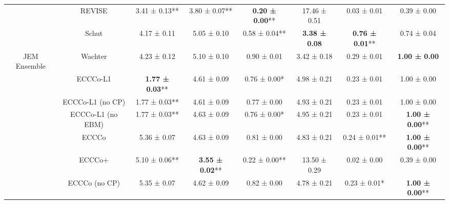 \begin{table}
{\begin{tabular}[t]{cccccccc}
 & REVISE & 3.41 ± 0.13** & 3.80 ± 0.07** & \textbf{0.20 ± 0.00}** & 17.46 ± 0.51\hphantom{*}\hphantom{*} & 0.03 ± 0.01\hphantom{*}\hphantom{*} & 0.39 ± 0.00\hphantom{*}\hphantom{*}\\

 & Schut & 4.17 ± 0.11\hphantom{*}\hphantom{*} & 5.05 ± 0.10\hphantom{*}\hphantom{*} & 0.58 ± 0.04** & \textbf{3.38 ± 0.08}\hphantom{*}\hphantom{*} & \textbf{0.76 ± 0.01}** & 0.74 ± 0.04\hphantom{*}\hphantom{*}\\

\multirow[t]{-10}{*}{\centering\arraybackslash JEM Ensemble} & Wachter & 4.23 ± 0.12\hphantom{*}\hphantom{*} & 5.10 ± 0.10\hphantom{*}\hphantom{*} & 0.90 ± 0.01\hphantom{*}\hphantom{*} & 3.42 ± 0.18\hphantom{*}\hphantom{*} & 0.29 ± 0.01\hphantom{*}\hphantom{*} & \textbf{1.00 ± 0.00}\hphantom{*}\hphantom{*}\\
\cmidrule{1-8}
 & ECCCo-L1 & \textbf{1.77 ± 0.03}** & 4.61 ± 0.09\hphantom{*}\hphantom{*} & 0.76 ± 0.00*\hphantom{*} & 4.98 ± 0.21\hphantom{*}\hphantom{*} & 0.23 ± 0.01\hphantom{*}\hphantom{*} & 1.00 ± 0.00\hphantom{*}\hphantom{*}\\

 & ECCCo-L1 (no CP) & 1.77 ± 0.03** & 4.61 ± 0.09\hphantom{*}\hphantom{*} & 0.77 ± 0.00\hphantom{*}\hphantom{*} & 4.93 ± 0.21\hphantom{*}\hphantom{*} & 0.23 ± 0.01\hphantom{*}\hphantom{*} & 1.00 ± 0.00\hphantom{*}\hphantom{*}\\

 & ECCCo-L1 (no EBM) & 1.77 ± 0.03** & 4.63 ± 0.09\hphantom{*}\hphantom{*} & 0.76 ± 0.00*\hphantom{*} & 4.95 ± 0.21\hphantom{*}\hphantom{*} & 0.23 ± 0.01\hphantom{*}\hphantom{*} & \textbf{1.00 ± 0.00}**\\

 & ECCCo & 5.36 ± 0.07\hphantom{*}\hphantom{*} & 4.63 ± 0.09\hphantom{*}\hphantom{*} & 0.81 ± 0.00\hphantom{*}\hphantom{*} & 4.83 ± 0.21\hphantom{*}\hphantom{*} & 0.24 ± 0.01** & \textbf{1.00 ± 0.00}**\\

 & ECCCo+ & 5.10 ± 0.06** & \textbf{3.55 ± 0.02}** & 0.22 ± 0.00** & 13.50 ± 0.29\hphantom{*}\hphantom{*} & 0.02 ± 0.00\hphantom{*}\hphantom{*} & 0.39 ± 0.00\hphantom{*}\hphantom{*}\\

 & ECCCo (no CP) & 5.35 ± 0.07\hphantom{*}\hphantom{*} & 4.62 ± 0.09\hphantom{*}\hphantom{*} & 0.82 ± 0.00\hphantom{*}\hphantom{*} & 4.78 ± 0.21\hphantom{*}\hphantom{*} & 0.23 ± 0.01*\hphantom{*} & \textbf{1.00 ± 0.00}**\\


\end{tabular}}
\end{table}
